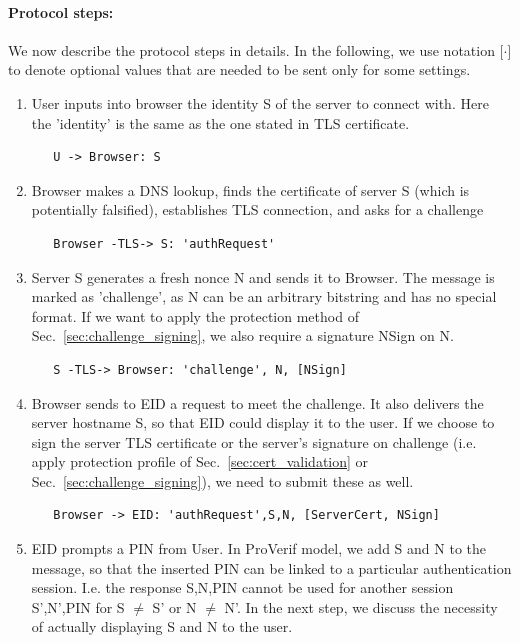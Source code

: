 \paragraph{Protocol steps:}We now describe the protocol steps in details. In the following, we use notation [$\cdot$] to denote optional values that are needed to be sent only for some settings.
\begin{enumerate}
\item\label{item:auth:step1} User inputs into browser the identity S of the server to connect with. Here the 'identity' is the same as the one stated in TLS certificate.
\begin{verbatim}
   U -> Browser: S
\end{verbatim}
\item\label{item:auth:step2} Browser makes a DNS lookup, finds the certificate of server S (which is potentially falsified), establishes TLS connection, and asks for a challenge
\begin{verbatim}
   Browser -TLS-> S: 'authRequest'
\end{verbatim}
\item\label{item:auth:step3} Server S generates a fresh nonce N and sends it to Browser. The message is marked as 'challenge', as N can be an arbitrary bitstring and has no special format. If we want to apply the protection method of Sec.~\ref{sec:challenge_signing}, we also require a signature NSign on N.
\begin{verbatim}
   S -TLS-> Browser: 'challenge', N, [NSign]
\end{verbatim}
\item\label{item:auth:step4} Browser sends to EID a request to meet the challenge. It also delivers the server hostname S, so that EID could display it to the user. If we choose to sign the server TLS certificate or the server's signature on challenge (i.e. apply protection profile of Sec.~\ref{sec:cert_validation} or Sec.~\ref{sec:challenge_signing}), we need to submit these as well.
\begin{verbatim}
   Browser -> EID: 'authRequest',S,N, [ServerCert, NSign]
\end{verbatim}
\item\label{item:auth:step5} EID prompts a PIN from User. In ProVerif model, we add S and N to the message, so that the inserted PIN can be linked to a particular authentication session. I.e. the response S,N,PIN cannot be used for another session S',N',PIN for S $\neq$ S' or N $\neq$ N'. In the next step, we discuss the necessity of actually displaying S and N to the user.

\end{enumerate}
